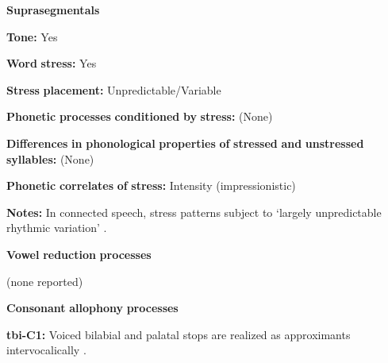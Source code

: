 \begin{styleBody}
\textbf{Suprasegmentals}
\end{styleBody}

\begin{styleBody}
\textbf{Tone:} Yes
\end{styleBody}

\begin{styleBody}
\textbf{Word} \textbf{stress:} Yes
\end{styleBody}

\begin{styleBody}
\textbf{Stress} \textbf{placement:} Unpredictable/Variable
\end{styleBody}

\begin{styleBody}
\textbf{Phonetic} \textbf{processes} \textbf{conditioned} \textbf{by} \textbf{stress:} (None)
\end{styleBody}

\begin{styleBody}
\textbf{Differences} \textbf{in} \textbf{phonological} \textbf{properties} \textbf{of} \textbf{stressed} \textbf{and} \textbf{unstressed} \textbf{syllables:} (None)
\end{styleBody}

\begin{styleBody}
\textbf{Phonetic} \textbf{correlates} \textbf{of} \textbf{stress:} Intensity (impressionistic)
\end{styleBody}

\begin{styleBody}
\textbf{Notes:} In connected speech, stress patterns subject to ‘largely unpredictable rhythmic variation’ \citep[12-13]{Crewe1975}.
\end{styleBody}

\begin{styleBody}
\textbf{Vowel} \textbf{reduction} \textbf{processes}
\end{styleBody}

\begin{styleBody}
(none reported)
\end{styleBody}

\begin{styleBody}
\textbf{Consonant} \textbf{allophony} \textbf{processes}
\end{styleBody}

\begin{styleBody}
\textbf{tbi-C1:} Voiced bilabial and palatal stops are realized as approximants intervocalically \citep[25]{Stirtz2011}.
\end{styleBody}

